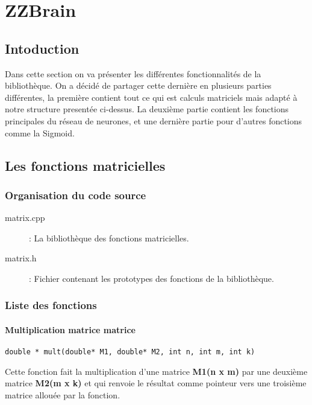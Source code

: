 \section{ZZBrain}

\subsection{Intoduction}
Dans cette section on va présenter les différentes fonctionnalités de la bibliothèque.
On a décidé de partager cette dernière en plusieurs parties différentes, la première contient tout ce qui est calculs matriciels mais adapté à notre structure presentée ci-dessus.
La deuxième partie contient les fonctions principales du réseau de neurones, et une dernière partie pour d'autres fonctions comme la Sigmoid.

\subsection{Les fonctions matricielles}

\subsubsection{Organisation du code source}

\begin{description}
\item[matrix.cpp] : La bibliothèque des fonctions matricielles.
\item[matrix.h] : Fichier contenant les prototypes des fonctions de la bibliothèque.
\end{description}
\subsubsection{Liste des fonctions}

\paragraph{Multiplication matrice matrice}
\begin{verbatim}
double * mult(double* M1, double* M2, int n, int m, int k)
\end{verbatim}

Cette fonction fait la multiplication d'une matrice \textbf{M1(n x m)} par une deuxième matrice \textbf{M2(m x k)} et qui renvoie le résultat comme pointeur vers une troisième matrice allouée par la fonction.

